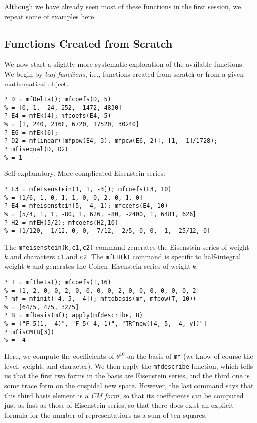 \documentclass[11pt]{article}
\renewcommand{\th}{\theta}
\def\kbd#1{{\tt #1}}
\begin{document}
Although we have already seen most of these functions in the first session,
we repeat some of examples here.

\subsection{Functions Created from Scratch}

We now start a slightly more systematic exploration of the available functions.
We begin by \emph{leaf functions}, i.e., functions created from scratch or
from a given mathematical object.

\begin{verbatim}
? D = mfDelta(); mfcoefs(D, 5)
% = [0, 1, -24, 252, -1472, 4830]
? E4 = mfEk(4); mfcoefs(E4, 5)
% = [1, 240, 2160, 6720, 17520, 30240]
? E6 = mfEk(6);
? D2 = mflinear([mfpow(E4, 3), mfpow(E6, 2)], [1, -1]/1728);
? mfisequal(D, D2)
% = 1
\end{verbatim}

  Self-explanatory. More complicated Eisenstein series:

\begin{verbatim}
? E3 = mfeisenstein(1, 1, -3]); mfcoefs(E3, 10)
% = [1/6, 1, 0, 1, 1, 0, 0, 2, 0, 1, 0]
? E4 = mfeisenstein(5, -4, 1); mfcoefs(E4, 10)
% = [5/4, 1, 1, -80, 1, 626, -80, -2400, 1, 6481, 626]
? H2 = mfEH(5/2); mfcoefs(H2,10)
% = [1/120, -1/12, 0, 0, -7/12, -2/5, 0, 0, -1, -25/12, 0]
\end{verbatim}

The \kbd{mfeisenstein(k,c1,c2)} command generates the Eisenstein series of weight
$k$ and characters \kbd{c1} and \kbd{c2}. The \kbd{mfEH(k)} command is specific
to half-integral weight $k$ and generates the Cohen--Eisenstein series of
weight $k$.

\begin{verbatim}
? T = mfTheta(); mfcoefs(T,16)
% = [1, 2, 0, 0, 2, 0, 0, 0, 0, 2, 0, 0, 0, 0, 0, 0, 2]
? mf = mfinit([4, 5, -4]); mftobasis(mf, mfpow(T, 10))
% = [64/5, 4/5, 32/5]
? B = mfbasis(mf); apply(mfdescribe, B)
% = ["F_5(1, -4)", "F_5(-4, 1)", "TR^new([4, 5, -4, y])"]
? mfisCM(B[3])
% = -4
\end{verbatim}

  Here, we compute the coefficients of $\th^{10}$ on the basis of \kbd{mf}
  (we know of course the level, weight, and character). We then apply
  the \kbd{mfdescribe} function, which tells us that the first two forms in
  the basis are Eisenstein series, and the third one is some trace form
  on the cuspidal new space. However, the last command says that this third
  basis element is a \emph{CM form}, so that its coefficients can be computed
  just as fast as those of Eisenstein series, so that there does exist
  an explicit formula for the number of representations as a sum of ten
  squares.
\end{document}

